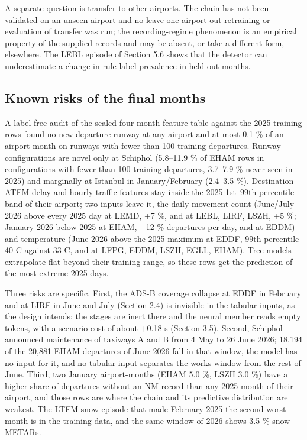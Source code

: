 \documentclass[11pt,a4paper]{article}
\begin{document}
A separate question is transfer to other airports. The chain has not been validated on an unseen airport and no leave-one-airport-out retraining or evaluation of transfer was run; the recording-regime phenomenon is an empirical property of the supplied records and may be absent, or take a different form, elsewhere. The LEBL episode of Section 5.6 shows that the detector can underestimate a change in rule-label prevalence in held-out months.

\subsection{Known risks of the final months}\label{known-risks-of-the-final-months}

A label-free audit of the sealed four-month feature table against the 2025 training rows found no new departure runway at any airport and at most 0.1 \% of an airport-month on runways with fewer than 100 training departures. Runway configurations are novel only at Schiphol (5.8--11.9 \% of EHAM rows in configurations with fewer than 100 training departures, 3.7--7.9 \% never seen in 2025) and marginally at Istanbul in January/February (2.4--3.5 \%). Destination ATFM delay and hourly traffic features stay inside the 2025 1st--99th percentile band of their airport; two inputs leave it, the daily movement count (June/July 2026 above every 2025 day at LEMD, +7 \%, and at LEBL, LIRF, LSZH, +5 \%; January 2026 below 2025 at EHAM, $-$12 \% departures per day, and at EDDM) and temperature (June 2026 above the 2025 maximum at EDDF, 99th percentile 40 \textdegree{}C against 33 \textdegree{}C, and at LFPG, EDDM, LSZH, EGLL, EHAM). Tree models extrapolate flat beyond their training range, so these rows get the prediction of the most extreme 2025 days.

Three risks are specific. First, the ADS-B coverage collapse at EDDF in February and at LIRF in June and July (Section 2.4) is invisible in the tabular inputs, as the design intends; the stages are inert there and the neural member reads empty tokens, with a scenario cost of about +0.18 s (Section 3.5). Second, Schiphol announced maintenance of taxiways A and B from 4 May to 26 June 2026; 18,194 of the 20,881 EHAM departures of June 2026 fall in that window, the model has no input for it, and no tabular input separates the works window from the rest of June. Third, two January airport-months (EHAM 5.0 \%, LSZH 3.0 \%) have a higher share of departures without an NM record than any 2025 month of their airport, and those rows are where the chain and its predictive distribution are weakest. The LTFM snow episode that made February 2025 the second-worst month is in the training data, and the same window of 2026 shows 3.5 \% snow METARs.
\end{document}
